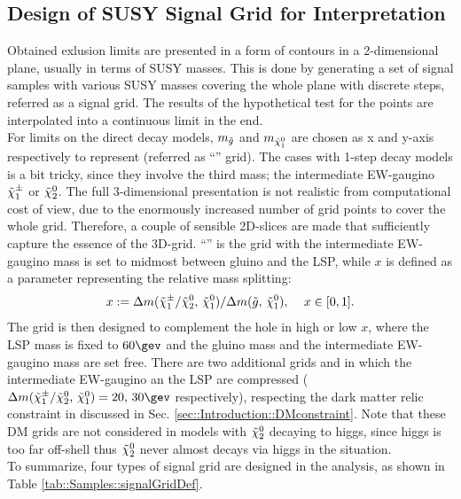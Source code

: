 

\subsection{Design of SUSY Signal Grid for Interpretation} 
Obtained exlusion limits are presented in a form of contours in a 2-dimensional plane, usually in terms of SUSY masses. This is done by generating a set of signal samples with various SUSY masses covering the whole plane with discrete steps, referred as a signal grid. The results of the hypothetical test for the points are interpolated into a continuous limit in the end. \\

For limits on the direct decay models, $m_{\tilde{g}}$ and $m_{\tilde{\chi}_{1}^{0}}$ are chosen as x and y-axis respectively to represent (referred as ``\dire'' grid). The cases with 1-step decay models is a bit tricky, since they involve the third mass; the intermediate EW-gaugino $\tilde{\chi}_{1}^{\pm}$ or $\tilde{\chi}_{2}^{0}$. The full 3-dimensional presentation is not realistic from computational cost of view, due to the enormously increased number of grid points to cover the whole grid. Therefore, a couple of sensible 2D-slices are made that sufficiently capture the essence of the 3D-grid. ``\xhalf'' is the grid with the intermediate EW-gaugino mass is set to midmost between gluino and the LSP, while $x$ is defined as a parameter representing the relative mass splitting:
\begin{align}
  x := \Delta m(\tilde{\chi}_{1}^{\pm}/\tilde{\chi}_{2}^{0}, \, \tilde{\chi}_{1}^{0})/\Delta m(\tilde{g}, \, \tilde{\chi}_{1}^{0}), \,\,\,\,\,\,\, x \in [0,1]. \nonumber
\end{align}
The \varx grid is then designed to complement the hole in high or low $x$, where the LSP mass is fixed to $60\gev$ and the gluino mass and the intermediate EW-gaugino mass are set free. There are two additional grids \DMtw and \DMth in which the intermediate EW-gaugino an the LSP are compressed ($\dmcn=20, \, 30\gev$ respectively), respecting the dark matter relic constraint in discussed in Sec. \ref{sec::Introduction::DMconstraint}. Note that these DM grids are not considered in models with $\tilde{\chi}_{2}^{0}$ decaying to higgs, since higgs is too far off-shell thus $\tilde{\chi}_{2}^{0}$ never almost decays via higgs in the situation. \\
To summarize, four types of signal grid are designed in the analysis, as shown in Table \ref{tab::Samples::signalGridDef}. 


